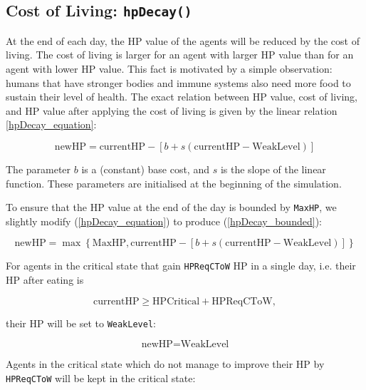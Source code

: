 \subsection{Cost of Living: \texorpdfstring{\lstinline$hpDecay()$}{hpDecay}}\label{hpDecay}
At the end of each day, the HP value of the agents will be reduced by the cost of living. The cost of living is larger for an agent with larger HP value than for an agent with lower HP value. This fact is motivated by a simple observation: humans that have stronger bodies and immune systems also need more food to sustain their level of health. The exact relation between HP value, cost of living, and HP value after applying the cost of living is given by the linear relation \eqref{hpDecay_equation}:

\begin{equation}\label{hpDecay_equation}
    \text{newHP} = \text{currentHP}-\left[b + s(\text{currentHP}-\text{WeakLevel})\right]
\end{equation}


The parameter $b$ is a (constant) base cost, and $s$ is the slope of the linear function. These parameters are initialised at the beginning of the simulation. 

To ensure that the HP value at the end of the day is bounded by \texttt{MaxHP}, we slightly modify (\ref{hpDecay_equation}) to produce (\ref{hpDecay_bounded}):

\begin{equation}\label{hpDecay_bounded}
    \text{newHP} =\max\left\{\text{MaxHP}, \text{currentHP}-\left[b + s(\text{currentHP}-\text{WeakLevel})\right]\right\}
\end{equation}

For agents in the critical state that gain \texttt{HPReqCToW} HP in a single day, i.e. their HP after eating is

\begin{equation}\label{HPReqCToW}
    \text{currentHP} \geq \text{HPCritical}+\text{HPReqCToW},
\end{equation}

their HP will be set to \texttt{WeakLevel}:

\begin{equation}\label{hpDecay_critical_upgrade}
    \text{newHP} = \text{WeakLevel}
\end{equation}

Agents in the critical state which do not manage to improve their HP by \lstinline$HPReqCToW$ will be kept in the critical state:

